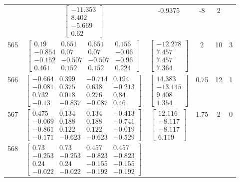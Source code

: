 \documentclass[a4paper,12pt]{article}
\begin{document}
\begin{tabular}{c c c c c c}
&
$\begin{bmatrix} -11.353 \\ 8.402 \\ -5.669 \\ 0.62 \end{bmatrix}$
&
-0.9375
&
-8
&
2
\\
565
&
$\begin{bmatrix} 0.19 & 0.651 & 0.651 & 0.156 \\ -0.854 & 0.07 & 0.07 & -0.06 \\ -0.152 & -0.507 & -0.507 & -0.96 \\ 0.461 & 0.152 & 0.152 & 0.224 \end{bmatrix}$
&
$\begin{bmatrix} -12.278 \\ 7.457 \\ 7.457 \\ 7.364 \end{bmatrix}$
&
2
&
10
&
3
\\
566
&
$\begin{bmatrix} -0.664 & 0.399 & -0.714 & 0.194 \\ -0.081 & 0.375 & 0.638 & -0.213 \\ 0.732 & 0.018 & 0.276 & 0.84 \\ -0.13 & -0.837 & -0.087 & 0.46 \end{bmatrix}$
&
$\begin{bmatrix} 14.383 \\ -13.145 \\ 9.408 \\ 1.354 \end{bmatrix}$
&
0.75
&
12
&
1
\\
567
&
$\begin{bmatrix} 0.475 & 0.134 & 0.134 & -0.413 \\ -0.069 & 0.188 & 0.188 & -0.741 \\ -0.861 & 0.122 & 0.122 & -0.019 \\ -0.171 & -0.623 & -0.623 & -0.529 \end{bmatrix}$
&
$\begin{bmatrix} 12.116 \\ -8.117 \\ -8.117 \\ 6.119 \end{bmatrix}$
&
1.75
&
2
&
0
\\
568
&
$\begin{bmatrix} 0.73 & 0.73 & 0.457 & 0.457 \\ -0.253 & -0.253 & -0.823 & -0.823 \\ 0.24 & 0.24 & -0.155 & -0.155 \\ -0.022 & -0.022 & -0.192 & -0.192 \end{bmatrix}$

\end{tabular}
\end{document}
